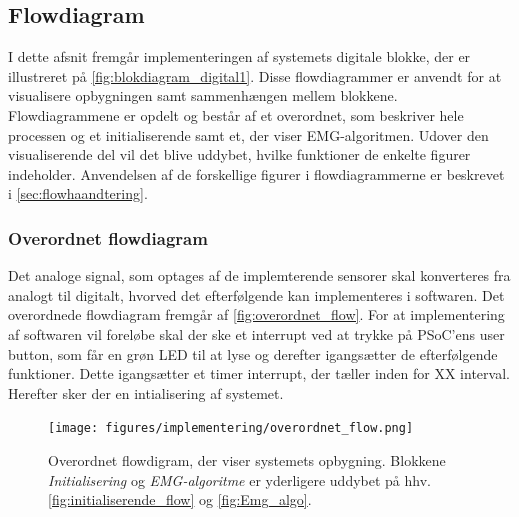 \subsection{Flowdiagram}
I dette afsnit fremgår implementeringen af systemets digitale blokke, der er illustreret på \autoref{fig:blokdiagram_digital1}. Disse flowdiagrammer er anvendt for at visualisere opbygningen samt sammenhængen mellem blokkene. Flowdiagrammene er opdelt og består af et overordnet, som beskriver hele processen og et initialiserende samt et, der viser EMG-algoritmen. Udover den visualiserende del vil det blive uddybet, hvilke funktioner de enkelte figurer indeholder. Anvendelsen af de forskellige figurer i flowdiagrammerne er beskrevet i \autoref{sec:flowhaandtering}.

\subsubsection{Overordnet flowdiagram}
Det analoge signal, som optages af de implemterende sensorer skal konverteres fra analogt til digitalt, hvorved det efterfølgende kan implementeres i softwaren. Det overordnede flowdiagram fremgår af \autoref{fig:overordnet_flow}. For at implementering af softwaren vil foreløbe skal der ske et interrupt ved at trykke på PSoC'ens user button, som får en grøn LED til at lyse og derefter igangsætter de efterfølgende funktioner. Dette igangsætter et timer interrupt, der tæller inden for XX interval. Herefter sker der en intialisering af systemet.
\begin{figure}[H]
\centering
\texttt{[image: figures/implementering/overordnet\_flow.png]}
\caption{Overordnet flowdigram, der viser systemets opbygning. Blokkene \emph{Initialisering} og \emph{EMG-algoritme} er yderligere uddybet på hhv. \autoref{fig:initialiserende_flow} og \autoref{fig:Emg_algo}. }
\label{fig:overordnet_flow}
\end{figure}

